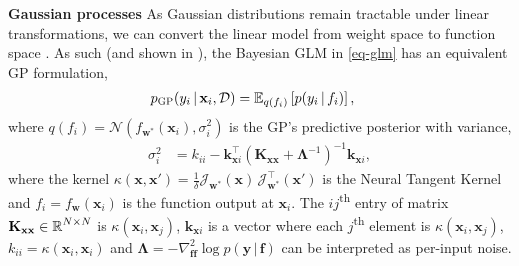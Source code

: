 \documentclass{article}
\newcommand{\weights}{\ensuremath{\mathbf{w}}}
\newcommand{\mbf}[1]{\mathbf{#1}}
\renewcommand{\mid}{\,|\,}
\newcommand{\vf}{\mbf{f}}
\newcommand{\vx}{\mbf{x}}
\newcommand{\vy}{\mbf{y}}
\newcommand{\vw}{\mbf{w}}
\newcommand{\Jac}[2]{\mathcal{J}_{#1}(#2)}
\newcommand{\JacT}[2]{\mathcal{J}_{#1}^\top(#2)}
\newcommand{\MKxx}{\mbf{K}_{\mbf{x}\mbf{x}}}
\newcommand{\vk}{\mbf{k}}
\newcommand{\myexpect}{\mathbb{E}}
\begin{document}
\textbf{Gaussian processes}
As Gaussian distributions remain tractable under linear transformations, we can convert the linear model from
weight space to function space \citep[see Ch.~2.1 in ][]{rasmussen2006gaussian}.
As such (and shown in \citet{immer2021improving}), the Bayesian GLM in \cref{eq-glm} has an equivalent GP formulation,
\begin{align} \label{eq-gp-pred-immer}
  p_{\text{\sc GP}}(y_{i} \mid \vx_{i}, \mathcal{D}) &= \E_{q(f_{i})} \left[ p(y_{i} \mid f_{i} )\right],
\end{align}
where $q(f_{i}) = \mathcal{N} \left( f_{\vw^{*}}(\vx_{i}), \sigma^{2}_{i} \right)$ is the GP's predictive posterior with variance,
\begin{align} \label{eq-gp-pred-immer-gp}
  \sigma^{2}_{i} &= k_{ii} - \vk_{\vx i}^\top ( \MKxx + \bm\Lambda^{-1})^{-1} \vk_{\vx i},
\end{align}
where the kernel $\kappa(\vx,\vx')=\frac{1}{\delta} \Jac{\weights^*}{\vx} \, \JacT{\weights^*}{\vx'}$ is the Neural Tangent Kernel \citep[NTK,][]{jacot2018neural}
and $f_i = f_\vw(\vx_i)$ is the function output at $\vx_i$.
The $ij$\textsuperscript{th} entry of matrix $\MKxx \in \R^{N \times N}$ is $\kappa(\vx_i,\vx_j)$, $\vk_{\vx i}$ is a vector where
each $j$\textsuperscript{th} element is $\kappa(\vx_i, \vx_j)$, $k_{ii} = \kappa(\vx_i, \vx_i)$ and $\bm\Lambda = - \nabla^2_{\vf \vf}\log p(\vy \mid \vf)$ can be interpreted as per-input noise.
\end{document}
